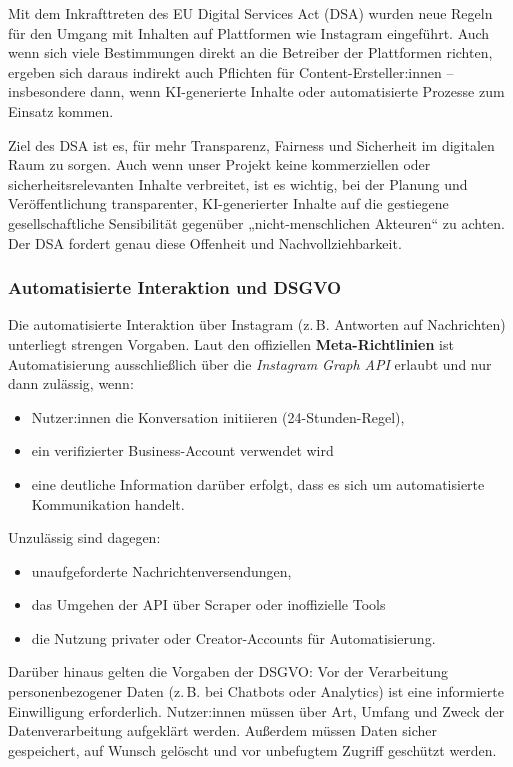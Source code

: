 \documentclass[a4paper,12pt]{article}
\begin{document}
Mit dem Inkrafttreten des EU Digital Services Act (DSA) wurden neue Regeln für den Umgang mit Inhalten auf Plattformen wie Instagram eingeführt. Auch wenn sich viele Bestimmungen direkt an die Betreiber der Plattformen richten, ergeben sich daraus indirekt auch Pflichten für Content-Ersteller:innen – insbesondere dann, wenn KI-generierte Inhalte oder automatisierte Prozesse zum Einsatz kommen.

Ziel des DSA ist es, für mehr Transparenz, Fairness und Sicherheit im digitalen Raum zu sorgen.
Auch wenn unser Projekt keine kommerziellen oder sicherheitsrelevanten Inhalte verbreitet, ist es wichtig, bei der Planung und Veröffentlichung transparenter, KI-generierter Inhalte auf die gestiegene gesellschaftliche Sensibilität gegenüber „nicht-menschlichen Akteuren“ zu achten. Der DSA fordert genau diese Offenheit und Nachvollziehbarkeit.

\subsubsection*{Automatisierte Interaktion und DSGVO}

Die automatisierte Interaktion über Instagram (z.\,B. Antworten auf Nachrichten) unterliegt strengen Vorgaben. Laut den offiziellen \textbf{Meta-Richtlinien} ist Automatisierung ausschließlich über die \textit{Instagram Graph API} erlaubt und nur dann zulässig, wenn:

\begin{itemize}
    \item Nutzer:innen die Konversation initiieren (24-Stunden-Regel),
    \item ein verifizierter Business-Account verwendet wird
    \item eine deutliche Information darüber erfolgt, dass es sich um automatisierte Kommunikation handelt.
\end{itemize}

Unzulässig sind dagegen:
\begin{itemize}
    \item unaufgeforderte Nachrichtenversendungen,
    \item das Umgehen der API über Scraper oder inoffizielle Tools
    \item die Nutzung privater oder Creator-Accounts für Automatisierung.
\end{itemize}

Darüber hinaus gelten die Vorgaben der DSGVO: Vor der Verarbeitung personenbezogener Daten (z.\,B. bei Chatbots oder Analytics) ist eine informierte Einwilligung erforderlich. Nutzer:innen müssen über Art, Umfang und Zweck der Datenverarbeitung aufgeklärt werden. Außerdem müssen Daten sicher gespeichert, auf Wunsch gelöscht und vor unbefugtem Zugriff geschützt werden.
\end{document}
